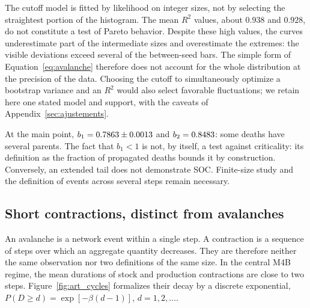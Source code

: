 The cutoff model is fitted by likelihood on integer sizes, not by
selecting the straightest portion of the histogram. The mean $R^2$
values, about $0.938$ and $0.928$, do not constitute a test of Pareto
behavior. Despite these high values, the curves underestimate part of
the intermediate sizes and overestimate the extremes: the visible
deviations exceed several of the between-seed bars. The simple form of
Equation~\eqref{eq:avalanche} therefore does not account for the whole
distribution at the precision of the data. Choosing the cutoff to
simultaneously optimize a bootstrap variance and an $R^2$ would also
select favorable fluctuations; we retain here one stated model and
support, with the caveats of Appendix~\ref{sec:ajustements}.

At the main point, $b_1=0.7863\pm0.0013$ and
$b_2=0.8483$: some deaths have several parents. The fact that
$b_1<1$ is not, by itself, a test against criticality: its definition
as the fraction of propagated deaths bounds it by construction.
Conversely, an extended tail does not demonstrate SOC. Finite-size
study and the definition of events across several steps remain
necessary.

\subsection{Short contractions, distinct from avalanches}
An avalanche is a network event within a single step. A contraction is
a sequence of steps over which an aggregate quantity decreases. They
are therefore neither the same observation nor two definitions of the
same size. In the central M4B regime, the mean durations of stock and
production contractions are close to two steps.
Figure~\ref{fig:art_cycles} formalizes their decay by a discrete
exponential, $P(D\ge d)=\exp[-\beta(d-1)]$, $d=1,2,\ldots$.


